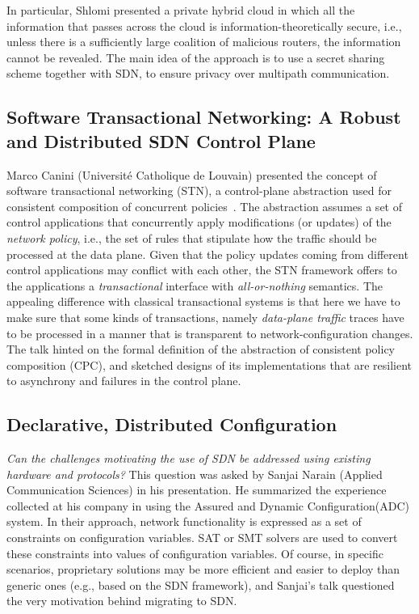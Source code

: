 \documentclass[11pt,pdftex,letter]{article}
\begin{document}
In particular, Shlomi presented a private hybrid cloud in which all the information that passes across the cloud is information-theoretically
secure, i.e., unless there is a sufficiently large coalition of malicious routers, the information cannot be revealed.
The main idea of the approach is to use a
secret sharing scheme together with SDN, to ensure privacy over
multipath communication.


\subsection{Software Transactional Networking: A Robust and
  Distributed SDN Control Plane}

Marco Canini (Universit\'{e} Catholique de Louvain) presented the concept of software transactional
networking (STN), a control-plane abstraction used for consistent
composition of concurrent policies~\cite{stn}. The abstraction assumes a set of
control applications that concurrently apply modifications (or
updates) of the
\emph{network policy}, i.e., the set of rules that stipulate how the
traffic should be processed at the data plane.
Given that the policy updates coming from different control applications may
conflict with each other, the STN framework offers to the applications
a \emph{transactional} interface with \emph{all-or-nothing} semantics.
The appealing difference with classical transactional systems is that
here we have to make sure that some kinds of transactions, namely
\emph{data-plane traffic} traces have to be processed in a manner that
is transparent to network-configuration changes.
The talk hinted on the formal definition of the abstraction of consistent policy
composition (CPC), and sketched designs of its implementations that
are resilient to asynchrony and failures in the control plane.

\subsection{Declarative, Distributed Configuration}

\emph{Can the challenges motivating the use of SDN be addressed using
existing hardware and protocols?} This question was  asked
by Sanjai Narain (Applied Communication Sciences) in his presentation.
He
summarized the
experience collected at his company in using the Assured and Dynamic
Configuration(ADC) system. In their approach, network functionality is
expressed as a set of constraints on configuration variables. SAT or
SMT solvers are used to convert these constraints into values of configuration variables.
Of course, in specific scenarios, proprietary solutions may be more
efficient and  easier to deploy than generic ones (e.g., based on the
SDN framework), and Sanjai's talk questioned the very
motivation behind migrating to SDN.
\end{document}
